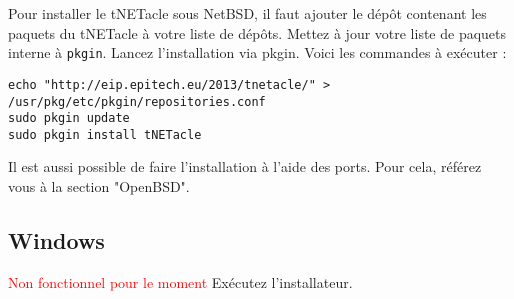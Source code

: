 Pour installer le tNETacle sous NetBSD, il faut ajouter le dépôt
contenant les paquets du tNETacle à votre liste de dépôts.
Mettez à jour votre liste de paquets interne à \texttt{pkgin}.
Lancez l'installation via pkgin.
Voici les commandes à exécuter :

\begin{lstlisting}
echo "http://eip.epitech.eu/2013/tnetacle/" > /usr/pkg/etc/pkgin/repositories.conf
sudo pkgin update
sudo pkgin install tNETacle
\end{lstlisting}

Il est aussi possible de faire l'installation à l'aide des ports.
Pour cela, référez vous à la section "OpenBSD".

\subsection{Windows}
\textcolor{red}{Non fonctionnel pour le moment}
Exécutez l'installateur.
